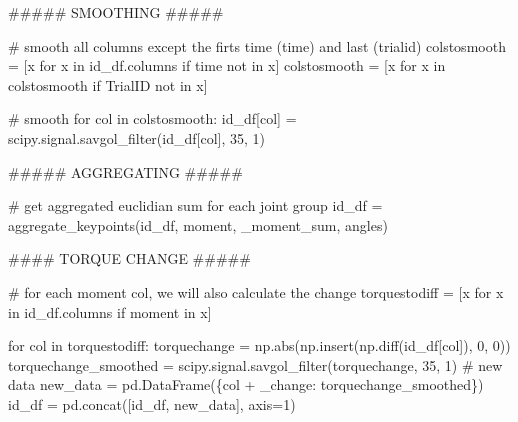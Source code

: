 \documentclass[
  letterpaper,
  DIV=11,
  numbers=noendperiod]{scrreprt}
\newenvironment{Shaded}{\begin{snugshade}}{\end{snugshade}}
\newcommand{\BuiltInTok}[1]{\textcolor[rgb]{0.00,0.23,0.31}{#1}}
\newcommand{\CommentTok}[1]{\textcolor[rgb]{0.37,0.37,0.37}{#1}}
\newcommand{\ControlFlowTok}[1]{\textcolor[rgb]{0.00,0.23,0.31}{#1}}
\newcommand{\DecValTok}[1]{\textcolor[rgb]{0.68,0.00,0.00}{#1}}
\newcommand{\KeywordTok}[1]{\textcolor[rgb]{0.00,0.23,0.31}{#1}}
\newcommand{\NormalTok}[1]{\textcolor[rgb]{0.00,0.23,0.31}{#1}}
\newcommand{\OperatorTok}[1]{\textcolor[rgb]{0.37,0.37,0.37}{#1}}
\newcommand{\StringTok}[1]{\textcolor[rgb]{0.13,0.47,0.30}{#1}}
\begin{document}
\begin{Shaded}
\begin{Highlighting}[]
    \CommentTok{\#\#\#\#\# SMOOTHING \#\#\#\#\#}

    \CommentTok{\# smooth all columns except the firts time (time) and last (trialid)}
\NormalTok{    colstosmooth }\OperatorTok{=}\NormalTok{ [x }\ControlFlowTok{for}\NormalTok{ x }\KeywordTok{in}\NormalTok{ id\_df.columns }\ControlFlowTok{if} \StringTok{\textquotesingle{}time\textquotesingle{}} \KeywordTok{not} \KeywordTok{in}\NormalTok{ x]}
\NormalTok{    colstosmooth }\OperatorTok{=}\NormalTok{ [x }\ControlFlowTok{for}\NormalTok{ x }\KeywordTok{in}\NormalTok{ colstosmooth }\ControlFlowTok{if} \StringTok{\textquotesingle{}TrialID\textquotesingle{}} \KeywordTok{not} \KeywordTok{in}\NormalTok{ x]}

    \CommentTok{\# smooth}
    \ControlFlowTok{for}\NormalTok{ col }\KeywordTok{in}\NormalTok{ colstosmooth:}
\NormalTok{        id\_df[col] }\OperatorTok{=}\NormalTok{ scipy.signal.savgol\_filter(id\_df[col], }\DecValTok{35}\NormalTok{, }\DecValTok{1}\NormalTok{)}

    \CommentTok{\#\#\#\#\# AGGREGATING \#\#\#\#\#}

    \CommentTok{\# get aggregated euclidian sum for each joint group}
\NormalTok{    id\_df }\OperatorTok{=}\NormalTok{ aggregate\_keypoints(id\_df, }\StringTok{\textquotesingle{}moment\textquotesingle{}}\NormalTok{, }\StringTok{\textquotesingle{}\_moment\_sum\textquotesingle{}}\NormalTok{, }\StringTok{\textquotesingle{}angles\textquotesingle{}}\NormalTok{)}

    \CommentTok{\#\#\#\# TORQUE CHANGE \#\#\#\#\#}

    \CommentTok{\# for each moment col, we will also calculate the change }
\NormalTok{    torquestodiff }\OperatorTok{=}\NormalTok{ [x }\ControlFlowTok{for}\NormalTok{ x }\KeywordTok{in}\NormalTok{ id\_df.columns }\ControlFlowTok{if} \StringTok{\textquotesingle{}moment\textquotesingle{}} \KeywordTok{in}\NormalTok{ x]}

    \ControlFlowTok{for}\NormalTok{ col }\KeywordTok{in}\NormalTok{ torquestodiff:}
\NormalTok{        torquechange }\OperatorTok{=}\NormalTok{ np.}\BuiltInTok{abs}\NormalTok{(np.insert(np.diff(id\_df[col]), }\DecValTok{0}\NormalTok{, }\DecValTok{0}\NormalTok{))}
\NormalTok{        torquechange\_smoothed }\OperatorTok{=}\NormalTok{ scipy.signal.savgol\_filter(torquechange, }\DecValTok{35}\NormalTok{, }\DecValTok{1}\NormalTok{)}
        \CommentTok{\# new data}
\NormalTok{        new\_data }\OperatorTok{=}\NormalTok{ pd.DataFrame(\{col }\OperatorTok{+} \StringTok{\textquotesingle{}\_change\textquotesingle{}}\NormalTok{: torquechange\_smoothed\})}
\NormalTok{        id\_df }\OperatorTok{=}\NormalTok{ pd.concat([id\_df, new\_data], axis}\OperatorTok{=}\DecValTok{1}\NormalTok{)}
    

\end{Highlighting}
\end{Shaded}
\end{document}
